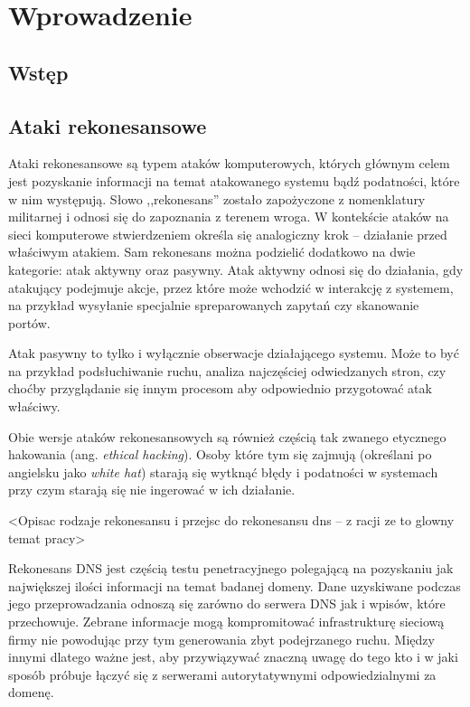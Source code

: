 \chapter{Wprowadzenie}

\section{Wstęp}


\section{Ataki rekonesansowe}
Ataki rekonesansowe są typem ataków komputerowych, których głównym celem jest pozyskanie informacji na temat atakowanego systemu bądź
podatności, które w nim występują. Słowo ,,rekonesans'' zostało zapożyczone z nomenklatury militarnej i odnosi się do zapoznania z
terenem wroga. W kontekście ataków na sieci komputerowe stwierdzeniem określa się analogiczny krok -- działanie przed właściwym atakiem.
Sam rekonesans można podzielić dodatkowo na dwie kategorie: atak aktywny oraz pasywny.
Atak aktywny odnosi się do działania, gdy atakujący podejmuje akcje, przez które może wchodzić w interakcję z systemem, na przykład
wysyłanie specjalnie spreparowanych zapytań czy skanowanie portów.

Atak pasywny to tylko i wyłącznie obserwacje działającego systemu. Może to być na przykład podsłuchiwanie ruchu, analiza najczęściej
odwiedzanych stron, czy choćby przyglądanie się innym procesom aby odpowiednio przygotować atak właściwy.

Obie wersje ataków rekonesansowych są również częścią tak zwanego etycznego hakowania (ang. \textit{ethical hacking}). Osoby które
tym się zajmują (określani po angielsku jako \textit{white hat}) starają się wytknąć błędy i podatności w systemach przy czym starają
się nie ingerować w ich działanie.

<Opisac rodzaje rekonesansu i przejsc do rekonesansu dns -- z racji ze to glowny temat pracy>

Rekonesans DNS jest częścią testu penetracyjnego polegającą na pozyskaniu jak największej ilości informacji na temat badanej domeny.
Dane uzyskiwane podczas jego przeprowadzania odnoszą się zarówno do serwera DNS jak i wpisów, które przechowuje. Zebrane informacje mogą
kompromitować infrastrukturę sieciową firmy nie powodując przy tym generowania zbyt podejrzanego ruchu. Między innymi dlatego
ważne jest, aby przywiązywać znaczną uwagę do tego kto i w jaki sposób próbuje łączyć się z serwerami autorytatywnymi odpowiedzialnymi
za domenę.


